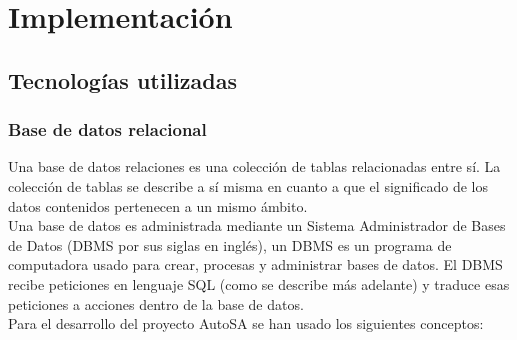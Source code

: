 \chapter{Implementación}\label{cap4}

\section{Tecnologías utilizadas}
\subsection{Base de datos relacional}\label{sec-bd-r}
Una base de datos relaciones es una colección de tablas relacionadas entre sí. La colección de tablas se describe a sí misma en cuanto a que el significado de los datos contenidos pertenecen a un mismo ámbito\cite{DataBaseConcepts}.\\
Una base de datos es administrada mediante un Sistema Administrador de Bases de Datos (DBMS por sus siglas en inglés), un DBMS es un programa de computadora usado para crear, procesas y administrar bases de datos. El DBMS recibe peticiones en lenguaje SQL (como se describe más adelante) y traduce esas peticiones a acciones dentro de la base de datos\cite{DataBaseConcepts}.\\
Para el desarrollo del proyecto AutoSA se han usado los siguientes conceptos:
